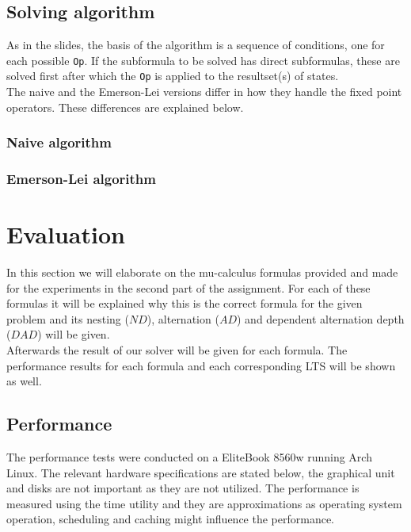 \documentclass[10pt,a4paper]{article}
\begin{document}
\subsection{Solving algorithm}
As in the slides, the basis of the algorithm is a sequence of conditions, one for each possible \texttt{Op}. If the subformula to be solved has direct subformulas, these are solved first after which the \texttt{Op} is applied to the resultset(s) of states.\\
The naive and the Emerson-Lei versions differ in how they handle the fixed point operators. These differences are explained below.

\subsubsection{Naive algorithm}


\subsubsection{Emerson-Lei algorithm}

\section{Evaluation}\label{eval}
In this section we will elaborate on the mu-calculus formulas provided and made for the experiments in the second part of the assignment. For each of these formulas it will be explained why this is the correct formula for the given problem and its nesting ($ND$), alternation ($AD$) and dependent alternation depth ($DAD$) will be given.\\
Afterwards the result of our solver will be given for each formula. The performance results for each formula and each corresponding LTS will be shown as well.

\subsection{Performance}

The performance tests were conducted on a EliteBook 8560w running Arch Linux. The relevant hardware specifications are stated below, the graphical unit and disks are not important as they are not utilized. The performance is measured using the time utility and they are approximations as operating system operation, scheduling and caching might influence the performance.
\end{document}
